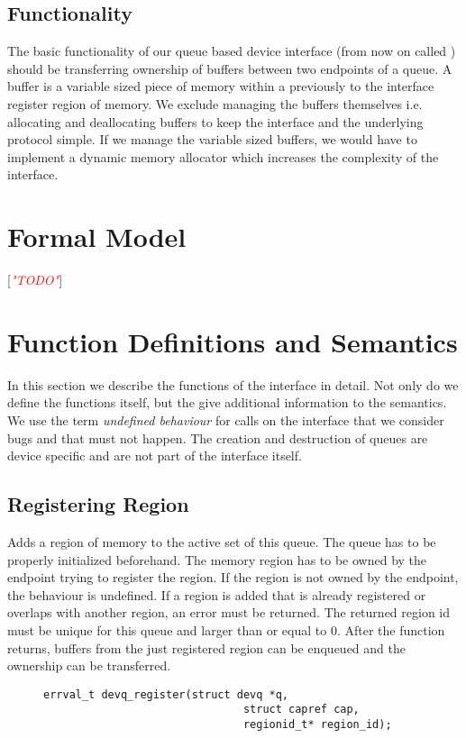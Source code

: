 \documentclass[a4paper,11pt,twoside]{report}
\newcommand{\todo}[1]{[\textcolor{red}{\emph{#1}}]}
\begin{document}
{{	\section{Functionality}
	The basic functionality of our queue based device interface (from now on called \devif) 
	should be transferring ownership of buffers between two endpoints of a queue.  
	A buffer is a variable sized piece of memory within a previously to the \devif interface 
	register region of memory. We exclude managing the buffers themselves i.e. allocating 
	and deallocating buffers to keep the interface and the underlying protocol simple. 
	If we manage the variable sized buffers, we would have to implement a dynamic memory 
	allocator which increases the complexity of the \devif interface. 
	
	\chapter{Formal Model}
	\todo{"TODO"}
	
	\chapter{Function Definitions and Semantics}
	In this section we describe the functions of the \devif interface in detail. 
	Not only do we define the functions itself, 
	but the give additional information to the semantics. We use the term 
	\textit{undefined behaviour} for calls on the interface that we consider
	bugs and that must not happen. The creation and destruction of queues 
	are device specific and are not part of the interface itself. 
	
	\section{Registering Region}
	Adds a region of memory to the active set of this queue. 
	The queue has to be properly initialized beforehand. 
	The memory region has to be owned by the endpoint trying to register the region. 
	If the region is not owned by the endpoint, the behaviour is undefined.
	If a region is added that is already registered or overlaps with another region, an error must be returned. The returned region id must be unique for this queue and larger than or equal to 0. After the function returns, buffers from the just registered region can be enqueued and the ownership
	can be transferred. 
	\begin{figure}[h]
		\begin{lstlisting}[style=code]
		errval_t devq_register(struct devq *q,
                               struct capref cap,
                               regionid_t* region_id);
		\end{lstlisting}
		\label{lst:register}
	\end{figure}
	
}}
\end{document}
